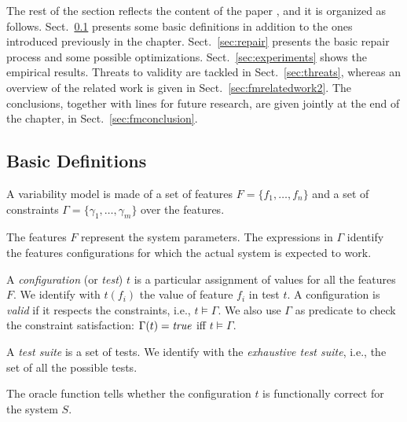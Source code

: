 \begin{tikzborder}{\cite{Gargantini16:validation}}
\begin{tikzborder}{\cite{gargantini_combinatorial_2017}}
\begin{tikzborder}{\cite{gargantini_combinatorial_2017}}
\begin{tikzborder}{\cite{garn2019}}
\begin{tikzborder}{\cite{arcaini2019achieving}}
	The rest of the section reflects the content of the paper \cite{arcaini2019varivolution}, and it is organized as follows. Sect.~\ref{sec:basic} presents some basic definitions in addition to the ones introduced previously in the chapter. Sect.~\ref{sec:repair} presents the basic repair process and some possible optimizations. Sect.~\ref{sec:experiments} shows the empirical results. Threats to validity are tackled in Sect.~\ref{sec:threats}, whereas an overview of the related work is given in Sect.~\ref{sec:fmrelatedwork2}. The conclusions, together with lines for future research, are given jointly at the end of the chapter, in Sect.~\ref{sec:fmconclusion}.
	
	\subsection{Basic Definitions}\label{sec:basic}
	
	\begin{tikzborder}{\cite{arcaini2019varivolution}}
		\begin{mydef}\label{def:varModel}
			A variability model \m is made of a set of features $F=\{f_1, \ldots, f_n\}$ and a set of constraints $\Gamma = \{\gamma_1,\ldots, \gamma_m\}$ over the features.
		\end{mydef}
		
		The features $F$ represent the system parameters. The expressions in $\Gamma$ identify the features configurations for which the actual system is expected to work.
		
		\begin{mydef}[Configuration]\label{def:configuration}
			A \emph{configuration} (or \emph{test}) $t$ is a particular assignment of values for all the features $F$. We identify with $t(f_i)$ the value of feature $f_i$ in test $t$. A configuration is {\it valid} if it respects the constraints, i.e., $t \models \Gamma$. We also use $\Gamma$ as predicate to check the constraint satisfaction: $\Gamma(t) = \mathit{true}$ iff $t \models \Gamma$.
		\end{mydef}
		
		\begin{mydef}\label{def:testSuite}
			A \emph{test suite} \testSuite is a set of tests. We identify with \exTestSuite the \emph{exhaustive test suite}, i.e., the set of all the possible tests.
		\end{mydef}
		
		\begin{mydef}[Oracle]\label{def:oracle}
			The oracle function \oraclet tells whether the configuration $t$ is functionally correct for the system $S$.
		\end{mydef}
		

\end{tikzborder}
\end{tikzborder}
\end{tikzborder}
\end{tikzborder}
\end{tikzborder}
\end{tikzborder}
